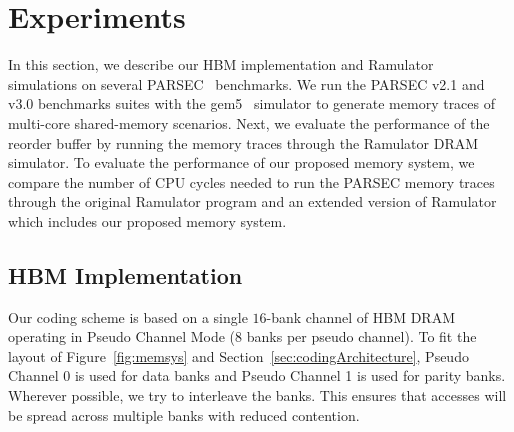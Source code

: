   \section{Experiments}
\label{sec:experiments}

In this section, we describe our HBM implementation and Ramulator~\cite{Ramulator} simulations on several PARSEC~\cite{bienia09parsec2} benchmarks. We run the PARSEC v2.1 and v3.0 benchmarks suites with the gem5~\cite{parsec_2_1_m5} simulator to generate memory traces of multi-core shared-memory scenarios. Next, we evaluate the performance of the reorder buffer by running the memory traces through the Ramulator DRAM simulator. To evaluate the performance of our proposed memory system, we compare the number of CPU cycles needed to run the PARSEC memory traces through the original Ramulator program and an extended version of Ramulator which includes our proposed memory system.

\subsection{HBM Implementation}
Our coding scheme is based on a single $16$-bank channel of HBM DRAM operating in Pseudo Channel Mode ($8$ banks per pseudo channel). To fit the layout of Figure~\ref{fig:memsys} and Section~\ref{sec:codingArchitecture}, Pseudo Channel 0 is used for data banks and Pseudo Channel 1 is used for parity banks. 
%
%
Wherever possible, we try to interleave the banks. This ensures that accesses will be spread across multiple banks with reduced contention.

